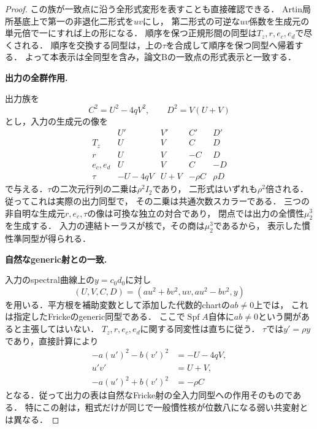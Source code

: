 \begin{proof}
この族が一致点に沿う全形式変形を表すことも直接確認できる．
Artin局所基底上で第一の非退化二形式を$uv$にし，
第二形式の可逆な$uv$係数を生成元の単元倍で一にすれば上の形になる．
順序を保つ正規形間の同型は$T_z,r,e_c,e_d$で尽くされる．
順序を交換する同型は，上の$\tau$を合成して順序を保つ同型へ帰着する．
よって本表示は全同型を含み，論文Bの一致点の形式表示と一致する．

\par\medskip\noindent\textbf{出力の全群作用.}\par\nobreak\smallskip
出力族を
\[
 C^2=U^2-4qV^2,\qquad D^2=V(U+V)
\]
とし，入力の生成元の像を
\[
 \begin{array}{c|cccc}
 &U'&V'&C'&D'\\\hline
 T_z&U&V&C&D\\
 r&U&V&-C&D\\
 e_c,e_d&U&V&C&-D\\
 \tau&-U-4qV&U+V&-\rho C&\rho D
 \end{array}
\]
で与える．$\tau$の二次元行列の二乗は$\rho^2I_2$であり，
二形式はいずれも$\rho^2$倍される．従ってこれは実際の出力同型で，
その二乗は共通次数スカラーである．
三つの非自明な生成元$r,e_c,\tau$の像は可換な独立の対合であり，
閉点では出力の全慣性$\mu_2^3$を生成する．
入力の連結トーラスが核で，その商は$\mu_2^3$であるから，
表示した慣性準同型が得られる．

\par\medskip\noindent\textbf{自然なgeneric射との一致.}\par\nobreak\smallskip
入力のspectral曲線上の$y=c_0d_0$に対し
\[
 (U,V,C,D)=(au^2+bv^2,uv,au^2-bv^2,y)
\]
を用いる．平方根を補助変数として添加した代数的chartの$ab\ne0$上では，
これは指定したFrickeのgeneric同型である．
ここで$\operatorname{Spf}A$自体に$ab\ne0$という開があると主張してはいない．
$T_z,r,e_c,e_d$に関する同変性は直ちに従う．
$\tau$では$y'=\rho y$であり，直接計算により
\[
 \begin{split}
 -a(u')^2-b(v')^2&=-U-4qV,\\
 u'v'&=U+V,\\
 -a(u')^2+b(v')^2&=-\rho C
 \end{split}
\]
となる．従って出力の表は自然なFricke射の全入力同型への作用そのものである．
特にこの射は，粗式だけが同じで一般慣性核が位数八になる弱い共変射とは異なる．
\end{proof}

